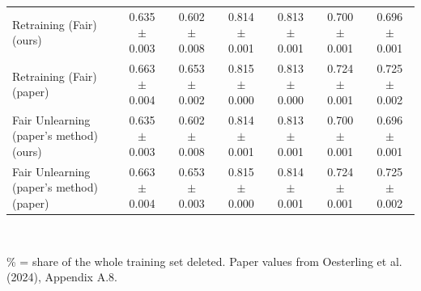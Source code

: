 \begin{table}[t]
\begin{tabular}{lcccccc}
Retraining (Fair) (ours) & 0.635 $\pm$ 0.003 & 0.602 $\pm$ 0.008 & 0.814 $\pm$ 0.001 & 0.813 $\pm$ 0.001 & 0.700 $\pm$ 0.001 & 0.696 $\pm$ 0.001 \\
Retraining (Fair) (paper) & 0.663 $\pm$ 0.004 & 0.653 $\pm$ 0.002 & 0.815 $\pm$ 0.000 & 0.813 $\pm$ 0.000 & 0.724 $\pm$ 0.001 & 0.725 $\pm$ 0.002 \\
Fair Unlearning (paper's method) (ours) & 0.635 $\pm$ 0.003 & 0.602 $\pm$ 0.008 & 0.814 $\pm$ 0.001 & 0.813 $\pm$ 0.001 & 0.700 $\pm$ 0.001 & 0.696 $\pm$ 0.001 \\
Fair Unlearning (paper's method) (paper) & 0.663 $\pm$ 0.004 & 0.653 $\pm$ 0.003 & 0.815 $\pm$ 0.000 & 0.814 $\pm$ 0.001 & 0.724 $\pm$ 0.001 & 0.725 $\pm$ 0.002 \\
\hline
\end{tabular}
\\[2pt]\parbox{\textwidth}{\footnotesize \% = share of the whole training set deleted. Paper values from Oesterling et al. (2024), Appendix A.8.}
\end{table}
